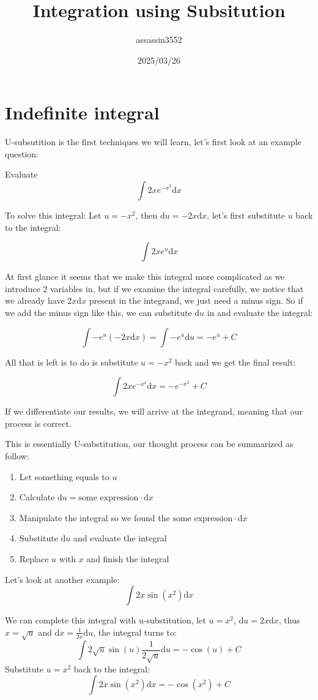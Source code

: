 \documentclass{article}
\title{Integration using Subsitution}
\author{assassin3552}
\date{2025/03/26}
\numberwithin{equation}{section}
\begin{document}
\maketitle

\section{Indefinite integral}
U-subsutition is the first techniques we will learn, let's first look at an example question:

Evaluate
\[
\int 2x e^{-x^2} \mathrm{d}x
\]

To solve this integral: Let $u = -x^2$, then $\mathrm{d}u = -2x \mathrm{d}x$, let's first substitute $u$ back to the integral:

\[
\int 2x e^u \mathrm{d}x
\]

At first glance it seems that we make this integral more complicated as we introduce 2 variables in,
but if we examine the integral carefully, we notice that we already have $2x\mathrm{d}x$ present in the integrand, we just need a minus sign.
So if we add the minus sign like this, we can substitute $\mathrm{d}u$ in and evaluate the integral:

\[
\int - e^u(-2x \mathrm{d}x) = \int -e^u \mathrm{d}u = -e^u+C
\]

All that is left is to do is substitute $u=-x^2$ back and we get the final result:

\[
\int 2xe^{-x^2} \mathrm{d}x = -e^{-x^2}+C
\]

If we differentiate our results, we will arrive at the integrand, meaning that our process is correct.

This is essentially U-substitution, our thought process can be summarized as follow:
\begin{enumerate}
    \item Let something equals to $u$
    \item Calculate $\mathrm{d}u = \text{some expression} \cdot \mathrm{d}x$
    \item Manipulate the integral so we found the $\text{some expression} \cdot \mathrm{d}x$
    \item Substitute $\mathrm{d}u$ and evaluate the integral
    \item Replace $u$ with $x$ and finish the integral
\end{enumerate}

\newpage
Let's look at another example:
\[
\int 2x \sin(x^2) \mathrm{d}x
\]

We can complete this integral with u-substitution, let $u=x^2$, $\mathrm{d}u = 2x \mathrm{d}x$, thus $x = \sqrt{u}$ and $\mathrm{d}x = \frac{1}{2x}\mathrm{d}u$, the integral turns to:
\[
\int 2\sqrt{u} \sin(u) \frac{1}{2\sqrt{u}}\mathrm{d}u = -\cos(u) + C
\]
Substitute $u = x^2$ back to the integral:
\[
\int 2x \sin(x^2)\mathrm{d}x = -\cos(x^2) + C
\]
\end{document}
